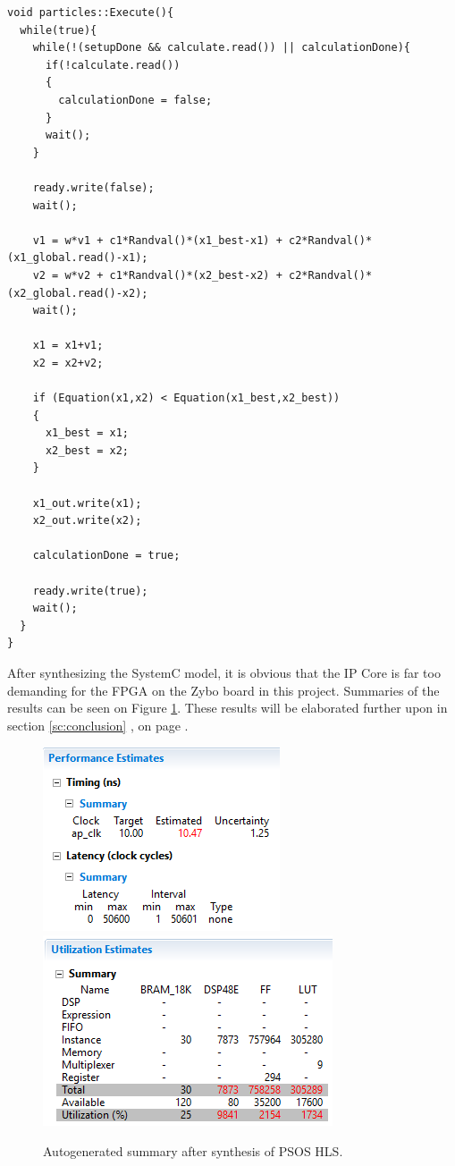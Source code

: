 \begin{lstlisting}[style=customc++, label={lst:particle_execute}, caption={Execute thread of Particle.}]
void particles::Execute(){
  while(true){
    while(!(setupDone && calculate.read()) || calculationDone){
      if(!calculate.read())
      {
        calculationDone = false;
      }
      wait();
    }

    ready.write(false);
    wait();

    v1 = w*v1 + c1*Randval()*(x1_best-x1) + c2*Randval()*(x1_global.read()-x1);
    v2 = w*v2 + c1*Randval()*(x2_best-x2) + c2*Randval()*(x2_global.read()-x2);
    wait();

    x1 = x1+v1;
    x2 = x2+v2;

    if (Equation(x1,x2) < Equation(x1_best,x2_best))
    {
      x1_best = x1;
      x2_best = x2;
    }

    x1_out.write(x1);
    x2_out.write(x2);

    calculationDone = true;

    ready.write(true);
    wait();
  }
}
\end{lstlisting}

After synthesizing the SystemC model, it is obvious that the IP Core is far too demanding for the FPGA on the Zybo board in this project. Summaries of the results can be seen on Figure \ref{fig:psossynthesissummary}. These results will be elaborated further upon in section \ref{sc:conclusion} , on page \pageref{sc:conclusion}.

\begin{figure}[H]
	\centering
	\includegraphics[width=0.415\linewidth]{diagram/psos_performance_summary}
	\includegraphics[width=0.5\linewidth]{diagram/psos_synthesis_summary}
	\caption{Autogenerated summary after synthesis of PSOS HLS.}
	\label{fig:psossynthesissummary}
\end{figure}

